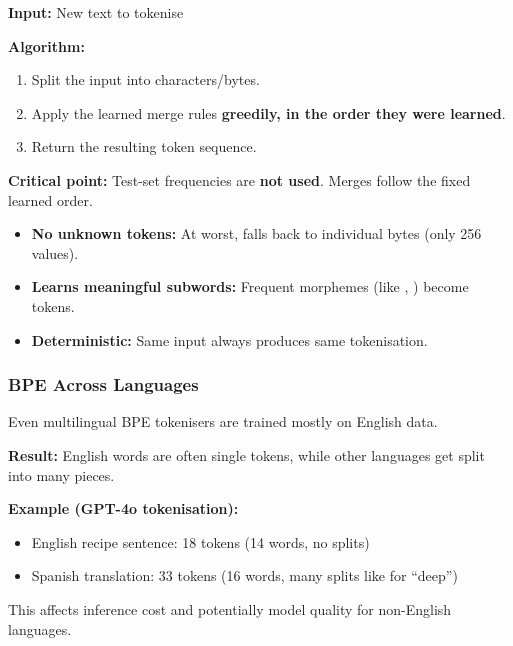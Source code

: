 \begin{thmbox}
\textbf{Input:} New text to tokenise

\textbf{Algorithm:}
\begin{enumerate}
  \item Split the input into characters/bytes.
  \item Apply the learned merge rules \textbf{greedily, in the order they were learned}.
  \item Return the resulting token sequence.
\end{enumerate}

\textbf{Critical point:} Test-set frequencies are \textbf{not used}. Merges follow the fixed learned order.
\end{thmbox}

\begin{tipbox}
\begin{itemize}
  \item \textbf{No unknown tokens:} At worst, falls back to individual bytes (only 256 values).
  \item \textbf{Learns meaningful subwords:} Frequent morphemes (like , ) become tokens.
  \item \textbf{Deterministic:} Same input always produces same tokenisation.
\end{itemize}
\end{tipbox}

\separator

\subsubsection{BPE Across Languages}

\begin{tipbox}
Even multilingual BPE tokenisers are trained mostly on English data.

\textbf{Result:} English words are often single tokens, while other languages get split into many pieces.

\textbf{Example (GPT-4o tokenisation):}
\begin{itemize}
  \item English recipe sentence: 18 tokens (14 words, no splits)
  \item Spanish translation: 33 tokens (16 words, many splits like  for ``deep'')
\end{itemize}

This affects inference cost and potentially model quality for non-English languages.
\end{tipbox}

\bigseparator

